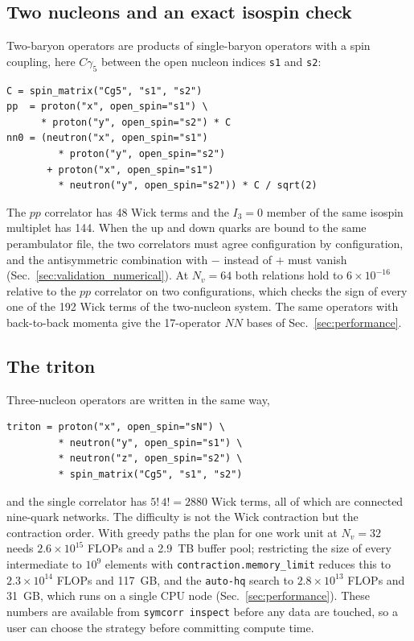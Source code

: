 \documentclass[a4paper,fleqn]{cas-dc}
\begin{document}
\FloatBarrier

\subsection{Two nucleons and an exact isospin check}
\label{sec:example_nn}

Two-baryon operators are products of single-baryon operators with a spin
coupling, here \(C\gamma_5\) between the open nucleon indices \texttt{s1} and
\texttt{s2}:
{\footnotesize
\begin{verbatim}
C = spin_matrix("Cg5", "s1", "s2")
pp  = proton("x", open_spin="s1") \
      * proton("y", open_spin="s2") * C
nn0 = (neutron("x", open_spin="s1")
         * proton("y", open_spin="s2")
       + proton("x", open_spin="s1")
         * neutron("y", open_spin="s2")) * C / sqrt(2)
\end{verbatim}
}
The \(pp\) correlator has 48 Wick terms and the \(I_3=0\) member of the same isospin
multiplet has 144. When the up and down quarks are bound to the same
perambulator file, the two correlators must agree configuration by
configuration, and the antisymmetric combination with \(-\) instead of \(+\) must
vanish (Sec.~\ref{sec:validation_numerical}). At \(N_v=64\) both relations hold to
\(6\times10^{-16}\) relative to the \(pp\) correlator on two configurations, which
checks the sign of every one of the 192 Wick terms of the two-nucleon system. The
same operators with back-to-back momenta give the 17-operator \(NN\) bases of
Sec.~\ref{sec:performance}.

\subsection{The triton}
\label{sec:example_triton}

Three-nucleon operators are written in the same way,
{\footnotesize
\begin{verbatim}
triton = proton("x", open_spin="sN") \
         * neutron("y", open_spin="s1") \
         * neutron("z", open_spin="s2") \
         * spin_matrix("Cg5", "s1", "s2")
\end{verbatim}
}
and the single correlator has \(5!\,4! = 2880\) Wick terms, all of which are
connected nine-quark networks. The difficulty is not the Wick contraction but
the contraction order. With greedy paths the plan for one work unit at
\(N_v=32\) needs \(2.6\times10^{15}\) FLOPs and a 2.9~TB buffer pool; restricting the
size of every intermediate to \(10^9\) elements with
\texttt{contraction.memory\_limit} reduces this to \(2.3\times10^{14}\) FLOPs and
117~GB, and the \texttt{auto-hq} search to \(2.8\times10^{13}\) FLOPs and 31~GB, which
runs on a single CPU node (Sec.~\ref{sec:performance}). These numbers are
available from \texttt{symcorr inspect} before any data are touched, so a user
can choose the strategy before committing compute time.
\end{document}
